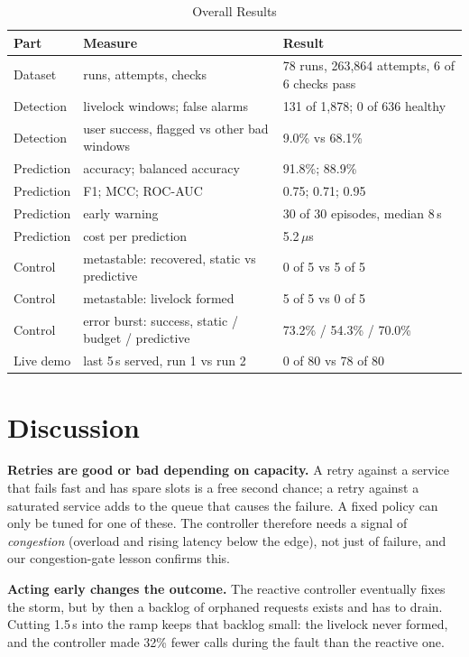 \documentclass[conference,a4paper]{IEEEtran}
\begin{document}
\begin{table}[!t]
\caption{Overall Results}
\label{tab:overall}
\centering
\small
\setlength{\tabcolsep}{4pt}
\begin{tabular}{|L{1.45cm}|L{3.0cm}|L{2.85cm}|}
\hline
\textbf{Part} & \textbf{Measure} & \textbf{Result} \\ \hline
Dataset & runs, attempts, checks & 78 runs, 263,864 attempts, 6 of 6 checks pass \\ \hline
Detection & livelock windows; false alarms & 131 of 1,878; 0 of 636 healthy \\ \hline
Detection & user success, flagged vs other bad windows & 9.0\% vs 68.1\% \\ \hline
Prediction & accuracy; balanced accuracy & 91.8\%; 88.9\% \\ \hline
Prediction & F1; MCC; ROC-AUC & 0.75; 0.71; 0.95 \\ \hline
Prediction & early warning & 30 of 30 episodes, median 8\,s \\ \hline
Prediction & cost per prediction & 5.2\,$\mu$s \\ \hline
Control & metastable: recovered, static vs predictive & 0 of 5 vs 5 of 5 \\ \hline
Control & metastable: livelock formed & 5 of 5 vs 0 of 5 \\ \hline
Control & error burst: success, static / budget / predictive & 73.2\% / 54.3\% / 70.0\% \\ \hline
Live demo & last 5\,s served, run 1 vs run 2 & 0 of 80 vs 78 of 80 \\ \hline
\end{tabular}
\end{table}

\section{Discussion}
\label{sec:disc}

\textbf{Retries are good or bad depending on capacity.} A retry against a service that fails fast and has spare slots is a free second chance; a retry against a saturated service adds to the queue that causes the failure. A fixed policy can only be tuned for one of these. The controller therefore needs a signal of \emph{congestion} (overload and rising latency below the edge), not just of failure, and our congestion-gate lesson confirms this.

\textbf{Acting early changes the outcome.} The reactive controller eventually fixes the storm, but by then a backlog of orphaned requests exists and has to drain. Cutting 1.5\,s into the ramp keeps that backlog small: the livelock never formed, and the controller made 32\% fewer calls during the fault than the reactive one.
\end{document}
